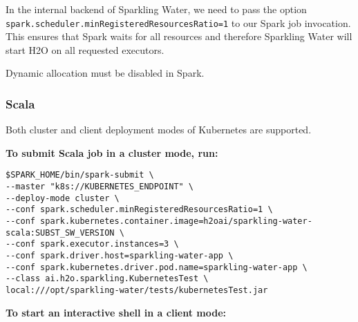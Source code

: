 In the internal backend of Sparkling Water, we need to pass the option \texttt{spark.scheduler.minRegisteredResourcesRatio=1}
to our Spark job invocation. This ensures that Spark waits for all resources and therefore Sparkling Water will
start H2O on all requested executors.

Dynamic allocation must be disabled in Spark.

\subsubsection{Scala}

Both cluster and client deployment modes of Kubernetes are supported.

\textbf{To submit Scala job in a cluster mode, run:}

\begin{lstlisting}[style=Bash]
$SPARK_HOME/bin/spark-submit \
--master "k8s://KUBERNETES_ENDPOINT" \
--deploy-mode cluster \
--conf spark.scheduler.minRegisteredResourcesRatio=1 \
--conf spark.kubernetes.container.image=h2oai/sparkling-water-scala:SUBST_SW_VERSION \
--conf spark.executor.instances=3 \
--conf spark.driver.host=sparkling-water-app \
--conf spark.kubernetes.driver.pod.name=sparkling-water-app \
--class ai.h2o.sparkling.KubernetesTest \
local:///opt/sparkling-water/tests/kubernetesTest.jar
\end{lstlisting}

\textbf{To start an interactive shell in a client mode:}

